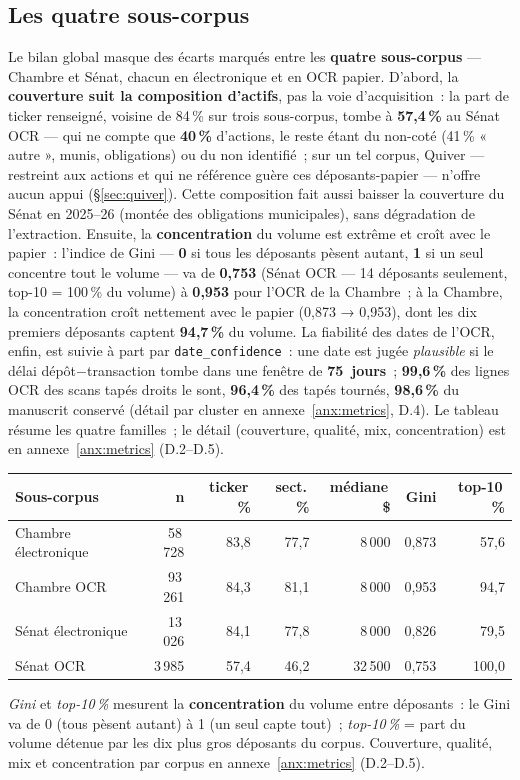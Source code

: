 \documentclass[11pt,a4paper]{article}
\newcommand{\co}[1]{\texttt{\small #1}}
\begin{document}
\subsection{Les quatre sous-corpus}
Le bilan global masque des écarts marqués entre les \textbf{quatre sous-corpus} — Chambre et Sénat, chacun
en électronique et en OCR papier. D'abord, la \textbf{couverture suit la composition d'actifs}, pas la voie
d'acquisition~: la part de ticker renseigné, voisine de 84\,\% sur trois sous-corpus, tombe à
\textbf{57,4\,\%} au Sénat OCR — qui ne compte que \textbf{40\,\%} d'actions, le reste étant du non-coté
(41\,\% « autre », munis, obligations) ou du non identifié~; sur un tel corpus, Quiver — restreint aux
actions et qui ne référence guère ces déposants-papier — n'offre aucun appui (\S{}\ref{sec:quiver}). Cette
composition fait aussi baisser la couverture du Sénat en 2025--26 (montée des obligations municipales), sans
dégradation de l'extraction. Ensuite, la \textbf{concentration} du volume est extrême et croît avec le
papier~: l'indice de Gini — \textbf{0} si tous les déposants pèsent autant, \textbf{1} si un seul concentre
tout le volume — va de \textbf{0,753} (Sénat OCR — 14 déposants seulement, top-10 = 100\,\% du volume) à \textbf{0,953} pour l'OCR de la Chambre~; à la Chambre, la concentration croît nettement avec le papier (0,873 → 0,953), dont
les dix premiers déposants captent \textbf{94,7\,\%} du volume. La fiabilité des dates de l'OCR, enfin, est
suivie à part par \co{date_confidence}~: une date est jugée \emph{plausible} si le délai
dépôt$-$transaction tombe dans une fenêtre de \textbf{75~jours}~; \textbf{99,6\,\%} des lignes OCR des scans
tapés droits le sont, \textbf{96,4\,\%} des tapés tournés, \textbf{98,6\,\%} du manuscrit conservé (détail
par cluster en annexe~\ref{anx:metrics}, D.4). Le tableau résume les quatre familles~; le détail
(couverture, qualité, mix, concentration) est en annexe~\ref{anx:metrics} (D.2--D.5).

\begin{center}\small
\begin{tabular}{l r rr r rr}
\toprule
\bfseries Sous-corpus & \bfseries n & \bfseries ticker\,\% & \bfseries sect.\,\% & \bfseries médiane\,\$ & \bfseries Gini & \bfseries top-10\,\%\\
\midrule
{\color{houseC}Chambre électronique} & 58\,728 & 83,8 & 77,7 & 8\,000 & 0,873 & 57,6 \\
{\color{houseC}Chambre OCR} & 93\,261 & 84,3 & 81,1 & 8\,000 & 0,953 & 94,7 \\
{\color{senateC}Sénat électronique} & 13\,026 & 84,1 & 77,8 & 8\,000 & 0,826 & 79,5 \\
{\color{senateC}Sénat OCR} & 3\,985 & 57,4 & 46,2 & 32\,500 & 0,753 & 100,0 \\
\bottomrule
\end{tabular}
\end{center}
{\footnotesize \emph{Gini} et \emph{top-10\,\%} mesurent la \textbf{concentration} du volume entre
déposants~: le Gini va de 0 (tous pèsent autant) à 1 (un seul capte tout)~; \emph{top-10\,\%} = part du
volume détenue par les dix plus gros déposants du corpus. Couverture, qualité, mix et concentration par
corpus en annexe~\ref{anx:metrics} (D.2--D.5).}
\end{document}
